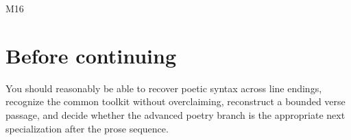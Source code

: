 \begin{courseunit}{M16}
\section{Before continuing}
You should reasonably be able to recover poetic syntax across line endings,
recognize the common toolkit without overclaiming, reconstruct a bounded verse
passage, and decide whether the advanced poetry branch is the appropriate next
specialization after the prose sequence.
\fi
\end{courseunit}
